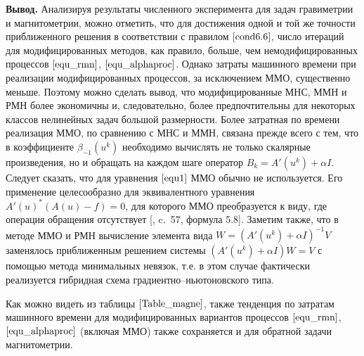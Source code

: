 {\bfseries\large Вывод.} Анализируя результаты численного эксперимента для задач гравиметрии и магнитометрии, можно отметить, что для достижения одной и той же точности приближенного решения в соответствии с правилом $\eqref{cond6.6}$, число итераций для модифицированных методов, как правило, больше, чем немодифицированных процессов $\eqref{equ_rmn}$, $\eqref{equ_alphaproc}$. Однако затраты машинного времени при реализации модифицированных процессов, за исключением ММО, существенно меньше. Поэтому можно сделать вывод, что модифицированные МНС, ММН и РМН более экономичны и, следовательно, более предпочтительны для некоторых классов нелинейных задач большой размерности. Более затратная по времени реализация ММО, по сравнению с МНС и ММН, связана прежде всего с тем, что в коэффициенте $\beta_{-1}(u^k)$ необходимо вычислять не только скалярные произведения, но и обращать на каждом шаге оператор $B_k=A'(u^k)+\alpha I$. Следует сказать, что для уравнения $\eqref{equ1}$ ММО обычно не используется. Его применение целесообразно для эквивалентного уравнения $A'(u)^*(A(u)-f)=0$, для которого ММО преобразуется к виду, где операция обращения отсутствует [\cite{VasEre2009},	c.~57, формула 5.8]. Заметим также, что в методе ММО и РМН вычисление элемента вида $W=(A'(u^k)+\alpha I)^{-1}V$ заменялось приближенным решением системы $(A'(u^k)+\alpha I)W=V$ с помощью метода минимальных невязок, т.е. в этом случае фактически реализуется гибридная схема градиентно--ньютоновского типа. 

Как можно видеть из таблицы $\ref{Table_magne}$, также тенденция по затратам машинного времени для модифицированных вариантов процессов $\eqref{equ_rmn}$, $\eqref{equ_alphaproc}$ (включая ММО) также сохраняется и для обратной задачи магнитометрии. 



